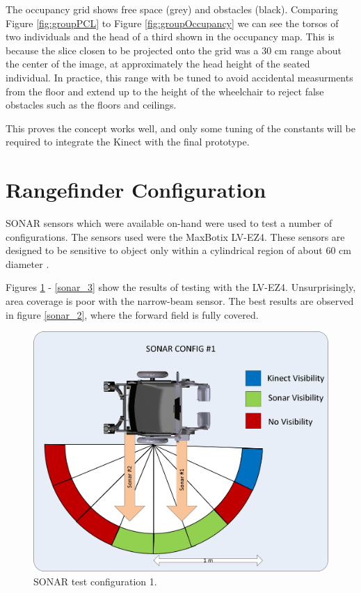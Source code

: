 \documentclass[oneside,final,a4paper]{report}
\begin{document}
The occupancy grid shows free space (grey) and obstacles (black). Comparing Figure \ref{fig:groupPCL} to Figure \ref{fig:groupOccupancy} we can see the torsos of two individuals and the head of a third shown in the occupancy map. This is because the slice closen to be projected onto the grid was a 30 cm range about the center of the image, at approximately the head height of the seated individual. In practice, this range with be tuned to avoid accidental measurments from the floor and extend up to the height of the wheelchair to reject false obstacles such as the floors and ceilings.

This proves the concept works well, and only some tuning of the constants will be required to integrate the Kinect with the final prototype.

\section{Rangefinder Configuration}
SONAR sensors which were available on-hand were used to test a number of configurations.  The sensors used were the MaxBotix LV-EZ4.  These sensors are designed to be sensitive to object only within a cylindrical region of about 60 cm diameter \cite{lv-ez4}.  

Figures \ref{sonar_1} - \ref{sonar_3} show the results of testing with the LV-EZ4.  Unsurprisingly, area coverage is poor with the narrow-beam sensor.  The best results are observed in figure \ref{sonar_2}, where the forward field is fully covered.

\begin{figure}[hbt]
 \centering
 \includegraphics[scale=0.6]{SONAR_Config1.png}
 \caption{SONAR test configuration 1.}
 \label{sonar_1}
\end{figure}
\end{document}
